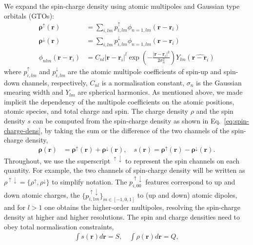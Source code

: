\documentclass[aps,%
superscriptaddress,
 amsmath,amssymb,
floatfix,
twocolumn
]{revtex4-2}
\begin{document}
We expand the spin-charge density using atomic multipoles and Gaussian type orbitals (GTOs):
\begin{align}
\label{eq:rho-up}
\mathbf{\rho^{\uparrow}}(\mathbf{r}) &= \sum_{i,lm} p_{i,lm}^{\uparrow} \phi_{n=1,lm}(\mathbf{r} - \mathbf{r}_i) \\
\label{eq:rho-down}
\mathbf{\rho^{\downarrow}}(\mathbf{r}) &= \sum_{i,lm} p_{i,lm}^{\downarrow} \phi_{n=1,lm}(\mathbf{r} - \mathbf{r}_i) \\
\phi_{nlm}(\mathbf{r} - \mathbf{r}_i) &=  C_{nl} |\mathbf{r} - \mathbf{r}_i|^{l} \exp\left(-\frac{|\mathbf{r} - \mathbf{r}_i|^2}{2\sigma_{n}^2}\right) Y_{lm}\!\left(\widehat{\mathbf{r} - \mathbf{r}_i}\right) \label{eq:gaussian-basis}
\end{align}
where $p_{i,lm}^{\uparrow}$ and $p_{i,lm}^{\downarrow}$ are the atomic multipole coefficients of spin-up and spin-down channels, respectively, $C_{nl}$ is a normalisation constant, $\sigma_n$ is the Gaussian smearing width and $Y_{lm}$ are spherical harmonics. As mentioned above, we made implicit the dependency of the multipole coefficients on the atomic positions, atomic species, and total charge and spin. The charge density $\rho$ and the spin density $s$ can be computed from the spin-charge density as shown in Eq.~\ref{eq:spin-charge-dens}, by taking the sum or the difference of the two channels of the spin-charge density,
\begin{align}
\label{eq:spin-charge-dens}
\mathbf{\rho}(\mathbf{r}) &= \mathbf{\rho^{\uparrow}}(\mathbf{r}) +  \mathbf{\rho^{\downarrow}}(\mathbf{r}), \quad s(\mathbf{r}) = \mathbf{\rho^{\uparrow}}(\mathbf{r}) - \mathbf{\rho^{\downarrow}}(\mathbf{r}).
\end{align}
Throughout, we use the superscript $^{\uparrow \downarrow}$ to represent the spin channels on each quantity. For example, the two channels of spin-charge density will be written as $\rho^{\uparrow \downarrow} = \{\rho^{\uparrow}, \rho^{\downarrow}\}$ to simplify notation. 
The $p_{i, 00}^{\uparrow \downarrow}$ features correspond to up and down atomic charges, the $\{p_{i, 1m}^{\uparrow \downarrow}\}_{m \in [-1, 0, 1]}$ to (up and down) atomic dipoles, and for $l>1$ one obtains the higher-order multipoles, resolving the spin-charge density at higher and higher resolutions.
The spin and charge densities need to obey total normalisation constraints,
\begin{align}
\int s(\mathbf{r})d\mathbf{r} = S, \quad \int \rho(\mathbf{r})d\mathbf{r} = Q,
\end{align}
\end{document}
